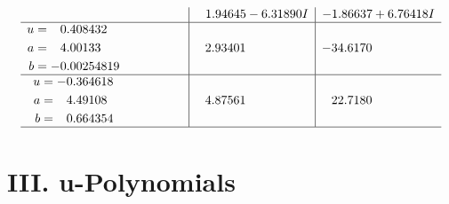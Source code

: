 \documentclass[1p]{elsarticle_modified}
\theoremstyle{definition}
\begin{document}
$$\begin{array}{c|c|c}
 & \phantom{-}1.94645 - 6.31890 I & -1.86637 + 6.76418 I \\ \hline\begin{aligned}
u &= \phantom{-}0.408432\phantom{ +0.000000I} \\
a &= \phantom{-}4.00133\phantom{ +0.000000I} \\
b &= -0.00254819\phantom{ +0.000000I}\end{aligned}
 & \phantom{-}2.93401\phantom{ +0.000000I} & -34.6170\phantom{ +0.000000I} \\ \hline\begin{aligned}
u &= -0.364618\phantom{ +0.000000I} \\
a &= \phantom{-}4.49108\phantom{ +0.000000I} \\
b &= \phantom{-}0.664354\phantom{ +0.000000I}\end{aligned}
 & \phantom{-}4.87561\phantom{ +0.000000I} & \phantom{-}22.7180\phantom{ +0.000000I}\\
 \hline 
 \end{array}$$\newpage
\newpage\renewcommand{\arraystretch}{1}
\centering \section*{ III. u-Polynomials}
\end{document}
